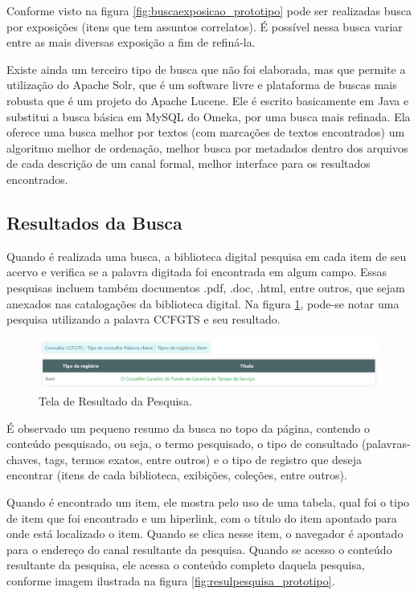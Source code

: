Conforme visto na figura \ref{fig:buscaexposicao_prototipo} pode ser realizadas busca por exposições (itens que tem assuntos correlatos). É possível nessa busca variar entre as mais diversas exposição a fim de refiná-la.

Existe ainda um terceiro tipo de busca que não foi elaborada, mas que permite a utilização do Apache Solr, que é um software livre e plataforma de buscas mais robusta que é um projeto do Apache Lucene. Ele é escrito basicamente em Java e substitui a busca básica em MySQL do Omeka, por uma busca mais refinada. Ela oferece uma busca melhor por textos (com marcações de textos encontrados) um algoritmo melhor de ordenação, melhor busca por metadados dentro dos arquivos de cada descrição de um canal formal, melhor interface para os resultados encontrados.

\subsection*{Resultados da Busca}

Quando é realizada uma busca, a biblioteca digital pesquisa em cada item de seu acervo e verifica se a palavra digitada foi encontrada em algum campo. Essas pesquisas incluem também documentos .pdf, .doc, .html, entre outros, que sejam anexados nas catalogações da biblioteca digital. Na figura \ref{fig:resultante_prototipo}, pode-se notar uma pesquisa utilizando a palavra CCFGTS e seu resultado.

\graphicspath{{figuras/prototipo/}}
\begin{figure}[H]
\centering
\includegraphics[width=1.1\textwidth]{resultado-pesquisa}
\caption{Tela de Resultado da Pesquisa.}
\label{fig:resultante_prototipo}
\end{figure}

É observado um pequeno resumo da busca no topo da página, contendo o conteúdo pesquisado, ou seja, o termo pesquisado, o tipo de consultado (palavras-chaves, tags, termos exatos, entre outros) e o tipo de registro que deseja encontrar (itens de cada biblioteca, exibições, coleções, entre outros). 
  
Quando é encontrado um item, ele mostra pelo uso de uma tabela, qual foi o tipo de item que foi encontrado e um hiperlink, com o título do item apontado para onde está localizado o item. Quando se clica nesse item, o navegador é apontado para o endereço do canal resultante da pesquisa. Quando se acesso o conteúdo resultante da pesquisa, ele acessa o conteúdo completo daquela pesquisa, conforme imagem ilustrada na figura \ref{fig:resulpesquisa_prototipo}. 

